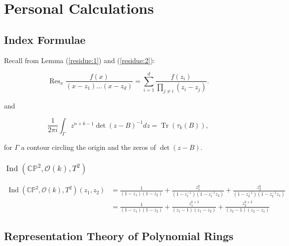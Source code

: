 \documentclass{article}
\newcommand{\PP}{\mathbb{P}}
\newcommand{\CC}{\mathbb{C}}
\newcommand{\mcO}{\mathcal{O}}
\newcommand{\pbrackets}[1]{\left( #1 \right)}
\DeclareMathOperator{\Tr}{Tr}
\DeclareMathOperator{\Ind}{Ind}
\DeclareMathOperator{\Res}{Res}
\begin{document}
	
	
	
	
	
	
	
	
	
	
	
	
	
	
	
	\newpage
	
	\section{Personal Calculations}
	
	\subsection{Index Formulae}
	
	Recall from Lemma (\ref{residue:1}) and (\ref{residue:2}):
	
	\begin{equation*}
		\Res_{x} \frac{f(x)}{(x - z_{1})\ldots(x - z_{d})} = \sum\limits_{i = 1}^{d}\frac{f(z_{i})}{\prod_{j \neq i}(z_{i} - z_{j})}.
	\end{equation*}
	
	and
	
	\begin{equation*}
		\frac{1}{2\pi i} \int_{\Gamma} z^{n + k -1} \det(z - B)^{-1} dz = \Tr\pbrackets{\tau_{k}(B)},
	\end{equation*}

	for $\Gamma$ a contour circling the origin and the zeros of $\det(z - B)$.
	
	\subsubsection{$\Ind(\CC\PP^{2}, \mcO(k), T^{2})$}
	
	\begin{equation*}
		\begin{split}
			\Ind(\CC\PP^{2}, \mcO(k), T^{2})(z_{1}, z_{2}) &= \frac{1}{(1 - z_{1})(1 - z_{2})} + \frac{z_{1}^{k}}{(1 - z_{1}^{-1})(1 - z_{1}^{-1}z_{2})} + \frac{z_{2}^{k}}{(1 - z_{2}^{-1})(1 - z_{2}^{-1}z_{1})} \\
			&= \frac{1}{(1 - z_{1})(1 - z_{2})} + \frac{z_{1}^{k+2}}{(z_{1} - 1)(z_{1} - z_{2})} + \frac{z_{2}^{k+2}}{(z_{2} - 1)(z_{2} - z_{1})}
		\end{split}
	\end{equation*}
	
	
		
	
	\subsection{Representation Theory of Polynomial Rings}
	
\end{document}
